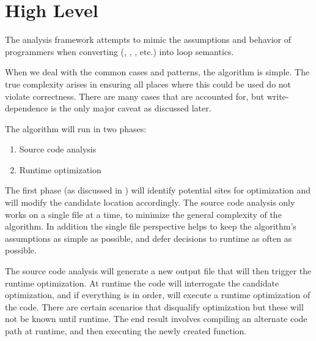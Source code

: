 \section{High Level}
The analysis framework attempts to mimic the assumptions and behavior of programmers when converting \pipelineoperators (, , , etc.) into  loop semantics. 

When we deal with the common cases and patterns, the algorithm is simple.  The true complexity arises in ensuring all places where this could be used do not violate correctness. There are many cases that are accounted for, but write-dependence is the only major caveat as discussed later.

The algorithm will run in two phases:
  \begin{enumerate}
    \item Source code analysis 
    \item Runtime optimization 
  \end{enumerate}

The first phase (as discussed in ) will identify potential sites for optimization and will modify the candidate location accordingly.  The source code analysis only works on a single file at a time, to minimize the general complexity of the algorithm. In addition the single file perspective helps to keep the algorithm's assumptions as simple as possible, and defer decisions to runtime as often as possible.

The source code analysis will generate a new output file that will then trigger the runtime optimization.  At runtime the code will interrogate the candidate optimization, and if everything is in order, will execute a runtime optimization of the code. There are certain scenarios that disqualify optimization but these will not be known until runtime.  The end result involves compiling an alternate code path at runtime, and then executing the newly created function.  